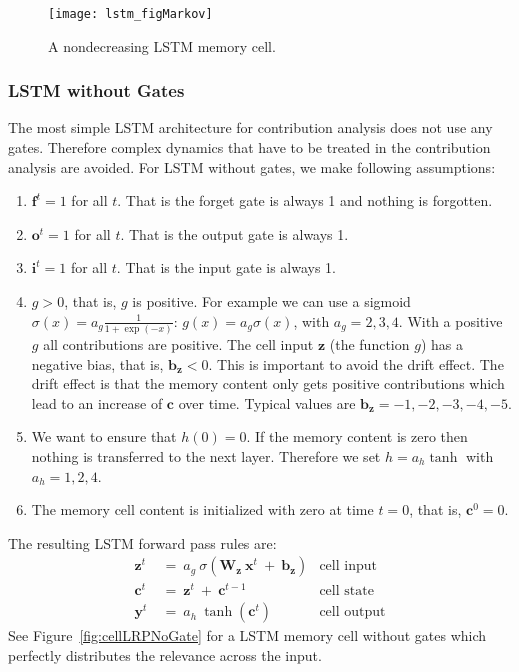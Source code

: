 \documentclass{article}
\newcommand\Bb{\bm{b}}
\newcommand\Bc{\bm{c}}
\newcommand\Bf{\bm{f}}
\newcommand\Bi{\bm{i}}
\newcommand\Bo{\bm{o}}
\newcommand\Bx{\bm{x}}
\newcommand\By{\bm{y}}
\newcommand\Bz{\bm{z}}
\newcommand\BW{\bm{W}}
\begin{document}
\begin{appendices}
\begin{figure}[htb]
\centering
\texttt{[image: lstm\_figMarkov]}
\caption{A nondecreasing LSTM memory cell. 
\label{fig:cellLRPMarkov}}
\end{figure}

\subsubsection{LSTM without Gates}

The most simple LSTM architecture for contribution analysis does not
use any gates. Therefore complex dynamics that have to be treated 
in the contribution analysis are avoided.
For LSTM without gates, 
we make following assumptions:
\begin{enumerate}[label=\textbf{(A\arabic*)}]
\item $\Bf^t=1$ for all $t$. That is the forget gate is always 1 and
  nothing is forgotten. 

\item $\Bo^t=1$ for all $t$. That is the output gate is always 1.

\item $\Bi^t=1$ for all $t$. That is the input gate is always 1.

\item $g>0$, that is, $g$ is positive. For example we can use a sigmoid
  $\sigma(x)= a_g \frac{1}{1+\exp(-x)}$: $g(x)=a_g \sigma(x)$, with
  $a_g = 2,3,4$.
  With a positive $g$ all
  contributions are positive.
  The cell input $\Bz$ (the function $g$) has a negative bias, that is,
  $\Bb_{\Bz}<0$. This is important to avoid the drift effect.
  The drift effect is that the memory content only gets positive
  contributions which lead to an increase of $\Bc$ over time.
  Typical values are $\Bb_{\Bz} = -1,-2,-3,-4,-5$.

\item We want to ensure that $h(0)=0$. If the memory content is zero
  then nothing is transferred to the next layer.
  Therefore we set $h=a_h \tanh$ with $a_h=1,2,4$.

\item The memory cell content is initialized with zero at time $t=0$,
  that is, $\Bc^0=0$. 
 
\end{enumerate}

The resulting LSTM forward pass rules are:
\begin{align}
\Bz^t \ &= \ a_g \ \sigma \left( \BW_{\Bz} \ \Bx^t \ + \
   \Bb_{\Bz}\right) & \text{cell input} \\
\Bc^t \ &= \  \Bz^t \ + \ \Bc^{t-1} & \text{cell state} \\
\By^t \ &= \ a_h \ \tanh\left( \Bc^t \right) &
\text{cell output}
\end{align}
See Figure~\ref{fig:cellLRPNoGate} for a LSTM memory cell without
gates which perfectly distributes the relevance across the input.



\end{appendices}
\end{document}
